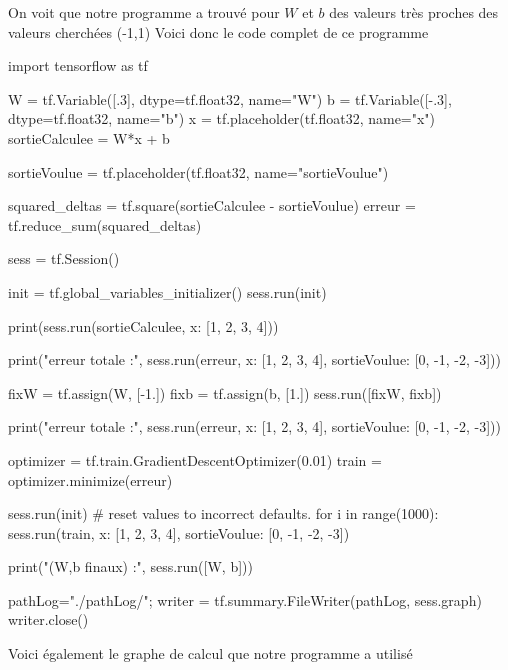 \documentclass[a4paper,11pt]{book}
\theoremstyle{theo}
\begin{document}
On voit que notre programme a trouvé pour $W$ et $b$ des valeurs très proches des valeurs cherchées (-1,1)
Voici donc le code complet de ce programme
\begin{mypython}
import tensorflow as tf

W = tf.Variable([.3], dtype=tf.float32, name="W")
b = tf.Variable([-.3], dtype=tf.float32, name="b")
x = tf.placeholder(tf.float32, name="x")
sortieCalculee = W*x + b

sortieVoulue = tf.placeholder(tf.float32, name="sortieVoulue")

squared_deltas = tf.square(sortieCalculee - sortieVoulue)
erreur = tf.reduce_sum(squared_deltas)


sess = tf.Session()


init = tf.global_variables_initializer()
sess.run(init)


print(sess.run(sortieCalculee, {x: [1, 2, 3, 4]}))

print("erreur totale :", sess.run(erreur, {x: [1, 2, 3, 4], sortieVoulue: [0, -1, -2, -3]}))


fixW = tf.assign(W, [-1.])
fixb = tf.assign(b, [1.])
sess.run([fixW, fixb])

print("erreur totale :", sess.run(erreur, {x: [1, 2, 3, 4], sortieVoulue: [0, -1, -2, -3]}))


optimizer = tf.train.GradientDescentOptimizer(0.01)
train = optimizer.minimize(erreur)

sess.run(init) # reset values to incorrect defaults.
for i in range(1000):
  sess.run(train, {x: [1, 2, 3, 4], sortieVoulue: [0, -1, -2, -3]})

print("(W,b finaux) :", sess.run([W, b]))

pathLog="./pathLog/";
writer = tf.summary.FileWriter(pathLog, sess.graph)
writer.close()
\end{mypython}
Voici également le graphe de calcul que notre programme a utilisé
\end{document}

